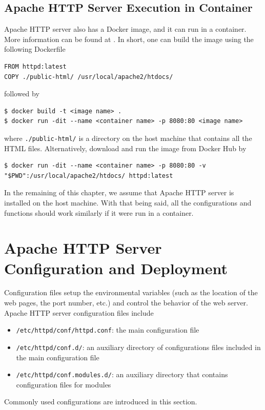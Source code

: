 \subsection{Apache HTTP Server Execution in Container}

Apache HTTP server also has a Docker image, and it can run in a container. More information can be found at \cite{docker2024httpd}. In short, one can build the image using the following Dockerfile 
\begin{lstlisting}
FROM httpd:latest
COPY ./public-html/ /usr/local/apache2/htdocs/
\end{lstlisting}
followed by
\begin{lstlisting}
$ docker build -t <image name> .
$ docker run -dit --name <container name> -p 8080:80 <image name>
\end{lstlisting}
where \verb|./public-html/| is a directory on the host machine that contains all the HTML files. Alternatively, download and run the image from Docker Hub by
\begin{lstlisting}
$ docker run -dit --name <container name> -p 8080:80 -v "$PWD":/usr/local/apache2/htdocs/ httpd:latest
\end{lstlisting}

In the remaining of this chapter, we assume that Apache HTTP server is installed on the host machine. With that being said, all the configurations and functions should work similarly if it were run in a container.

\section{Apache HTTP Server Configuration and Deployment}

Configuration files setup the environmental variables (such as the location of the web pages, the port number, etc.) and control the behavior of the web server. Apache HTTP server configuration files include
\begin{itemize}
	\item \verb|/etc/httpd/conf/httpd.conf|: the main configuration file
	\item \verb|/etc/httpd/conf.d/|: an auxiliary directory of configurations files included in the main configuration file
	\item \verb|/etc/httpd/conf.modules.d/|: an auxiliary directory that contains configuration files for modules
\end{itemize}

Commonly used configurations are introduced in this section.

